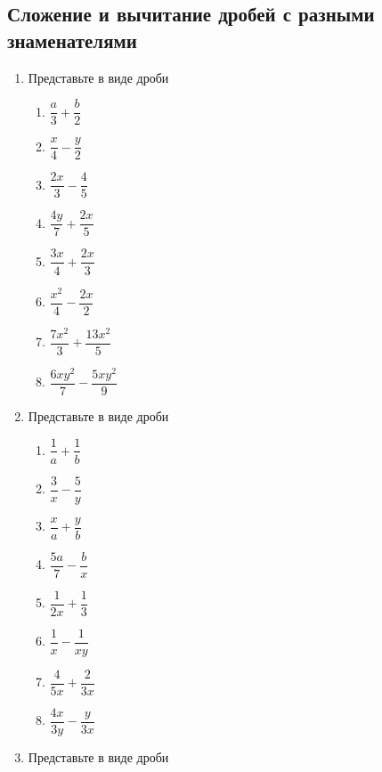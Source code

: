 \documentclass[10pt, a4paper]{article}
\begin{document}
\subsection{Сложение и вычитание дробей с разными знаменателями}
\begin{enumerate}
	\item Представьте в виде дроби
	\begin{multicols}{4}
		\begin{enumerate}
			\item $\dfrac{a}{3}+\dfrac{b}{2}$ 
			\item $\dfrac{x}{4}-\dfrac{y}{2}$ 
			\item $\dfrac{2x}{3}-\dfrac{4}{5}$ 
			\item $\dfrac{4y}{7}+\dfrac{2x}{5}$ 
			\item $\dfrac{3x}{4}+\dfrac{2x}{3}$ 
			\item $\dfrac{x^2}{4}-\dfrac{2x}{2}$ 
			\item $\dfrac{7x^2}{3}+\dfrac{13x^2}{5}$ 
			\item $\dfrac{6xy^2}{7}-\dfrac{5xy^2}{9}$ 
		\end{enumerate}	
	\end{multicols}
	\item Представьте в виде дроби
	\begin{multicols}{4}
		\begin{enumerate}
			\item $\dfrac{1}{a}+\dfrac{1}{b}$ 
			\item $\dfrac{3}{x}-\dfrac{5}{y}$ 
			\item $\dfrac{x}{a}+\dfrac{y}{b}$ 
			\item $\dfrac{5a}{7}-\dfrac{b}{x}$ 
			\item $\dfrac{1}{2x}+\dfrac{1}{3}$ 
			\item $\dfrac{1}{x}-\dfrac{1}{xy}$ 
			\item $\dfrac{4}{5x}+\dfrac{2}{3x}$ 
			\item $\dfrac{4x}{3y}-\dfrac{y}{3x}$ 
		\end{enumerate}	
	\end{multicols}
	\item Представьте в виде дроби

\end{enumerate}
\end{document}
